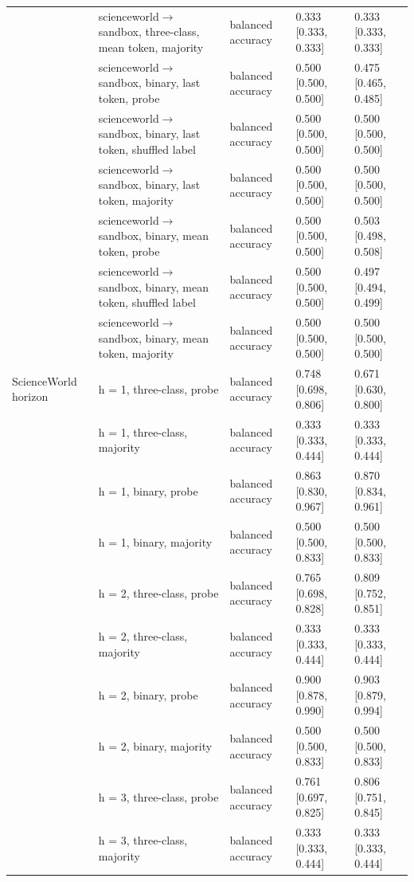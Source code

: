 \begin{tabular}{lllll}
 & scienceworld$\rightarrow$sandbox, three-class, mean token, majority & balanced accuracy & 0.333 [0.333, 0.333] & 0.333 [0.333, 0.333] \\
 & scienceworld$\rightarrow$sandbox, binary, last token, probe & balanced accuracy & 0.500 [0.500, 0.500] & 0.475 [0.465, 0.485] \\
 & scienceworld$\rightarrow$sandbox, binary, last token, shuffled label & balanced accuracy & 0.500 [0.500, 0.500] & 0.500 [0.500, 0.500] \\
 & scienceworld$\rightarrow$sandbox, binary, last token, majority & balanced accuracy & 0.500 [0.500, 0.500] & 0.500 [0.500, 0.500] \\
 & scienceworld$\rightarrow$sandbox, binary, mean token, probe & balanced accuracy & 0.500 [0.500, 0.500] & 0.503 [0.498, 0.508] \\
 & scienceworld$\rightarrow$sandbox, binary, mean token, shuffled label & balanced accuracy & 0.500 [0.500, 0.500] & 0.497 [0.494, 0.499] \\
 & scienceworld$\rightarrow$sandbox, binary, mean token, majority & balanced accuracy & 0.500 [0.500, 0.500] & 0.500 [0.500, 0.500] \\
\hline
ScienceWorld horizon & h = 1, three-class, probe & balanced accuracy & 0.748 [0.698, 0.806] & 0.671 [0.630, 0.800] \\
 & h = 1, three-class, majority & balanced accuracy & 0.333 [0.333, 0.444] & 0.333 [0.333, 0.444] \\
 & h = 1, binary, probe & balanced accuracy & 0.863 [0.830, 0.967] & 0.870 [0.834, 0.961] \\
 & h = 1, binary, majority & balanced accuracy & 0.500 [0.500, 0.833] & 0.500 [0.500, 0.833] \\
 & h = 2, three-class, probe & balanced accuracy & 0.765 [0.698, 0.828] & 0.809 [0.752, 0.851] \\
 & h = 2, three-class, majority & balanced accuracy & 0.333 [0.333, 0.444] & 0.333 [0.333, 0.444] \\
 & h = 2, binary, probe & balanced accuracy & 0.900 [0.878, 0.990] & 0.903 [0.879, 0.994] \\
 & h = 2, binary, majority & balanced accuracy & 0.500 [0.500, 0.833] & 0.500 [0.500, 0.833] \\
 & h = 3, three-class, probe & balanced accuracy & 0.761 [0.697, 0.825] & 0.806 [0.751, 0.845] \\
 & h = 3, three-class, majority & balanced accuracy & 0.333 [0.333, 0.444] & 0.333 [0.333, 0.444] \\

\end{tabular}
